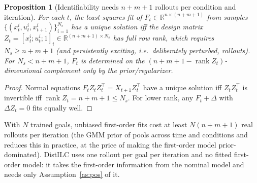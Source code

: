 \documentclass[11pt]{article}
\newtheorem{proposition}[theorem]{Proposition}
\theoremstyle{definition}
\theoremstyle{remark}
\newcommand{\R}{\mathbb{R}}
\begin{document}
\begin{proposition}[Identifiability needs $n+m+1$ rollouts per condition and iteration]\label{prop:ident}
For each $t$, the least-squares fit of $F_t\in\R^{n\times(n+m+1)}$ from samples
$\{(x_t^i,u_t^i,x_{t+1}^i)\}_{i=1}^{N_s}$ has a unique solution iff the design matrix $Z_t=[x_t^i;u_t^i;1]_{i}\in
\R^{(n+m+1)\times N_s}$ has full row rank, which requires $N_s\ge n+m+1$ (and persistently exciting, i.e.\ deliberately
perturbed, rollouts). For $N_s<n+m+1$, $F_t$ is determined on the $(n+m+1-\operatorname{rank}Z_t)$-dimensional
complement only by the prior/regularizer.
\end{proposition}
\begin{proof}
Normal equations $F_tZ_tZ_t^\top=X_{t+1}Z_t^\top$ have a unique solution iff $Z_tZ_t^\top$ is invertible iff
$\operatorname{rank}Z_t=n+m+1\le N_s$. For lower rank, any $F_t+\Delta$ with $\Delta Z_t=0$ fits equally well.
\end{proof}
With $N$ trained goals, unbiased first-order fits cost at least $N(n+m+1)$ real rollouts per iteration (the GMM prior of
\cite{levine2014unknown} pools across time and conditions and reduces this in practice, at the price of making the
first-order model prior-dominated). DistILC uses one rollout per goal per iteration and no fitted first-order model: it
takes the first-order information from the nominal model and needs only Assumption~\ref{as:pos} of it.
\end{document}
